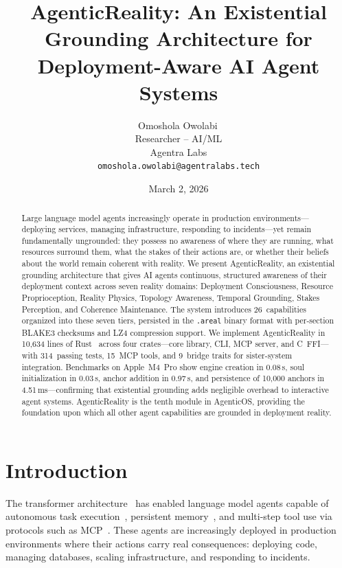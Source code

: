 \documentclass[10pt, twocolumn]{article}
\title{\textbf{AgenticReality: An Existential Grounding Architecture for\\Deployment-Aware AI Agent Systems}}
\author{Omoshola Owolabi\,\orcidlink{0009-0006-4089-0732}\\Researcher -- AI/ML\\Agentra Labs\\\texttt{omoshola.owolabi@agentralabs.tech}}
\date{March 2, 2026}
\begin{document}
\maketitle
\thispagestyle{fancy}

\begin{abstract}
Large language model agents increasingly operate in production environments---deploying services, managing infrastructure, responding to incidents---yet remain fundamentally ungrounded: they possess no awareness of where they are running, what resources surround them, what the stakes of their actions are, or whether their beliefs about the world remain coherent with reality.
We present AgenticReality, an existential grounding architecture that gives AI agents continuous, structured awareness of their deployment context across seven reality domains: Deployment Consciousness, Resource Proprioception, Reality Physics, Topology Awareness, Temporal Grounding, Stakes Perception, and Coherence Maintenance.
The system introduces 26~capabilities organized into these seven tiers, persisted in the \texttt{.areal} binary format with per-section BLAKE3 checksums and LZ4 compression support.
We implement AgenticReality in 10{,}634 lines of Rust~\cite{matsakis2014rust} across four crates---core library, CLI, MCP server, and C~FFI---with 314~passing tests, 15~MCP tools, and 9~bridge traits for sister-system integration.
Benchmarks on Apple~M4~Pro show engine creation in 0.08\,\textmu{}s, soul initialization in 0.03\,\textmu{}s, anchor addition in 0.97\,\textmu{}s, and persistence of 10{,}000 anchors in 4.51\,ms---confirming that existential grounding adds negligible overhead to interactive agent systems.
AgenticReality is the tenth module in AgenticOS, providing the foundation upon which all other agent capabilities are grounded in deployment reality.
\end{abstract}

\section{Introduction}
\label{sec:intro}

The transformer architecture~\cite{vaswani2017attention} has enabled language model agents capable of autonomous task execution~\cite{park2023generative}, persistent memory~\cite{packer2023memgpt}, and multi-step tool use via protocols such as MCP~\cite{mcp_spec_2024}. These agents are increasingly deployed in production environments where their actions carry real consequences: deploying code, managing databases, scaling infrastructure, and responding to incidents.
\end{document}
